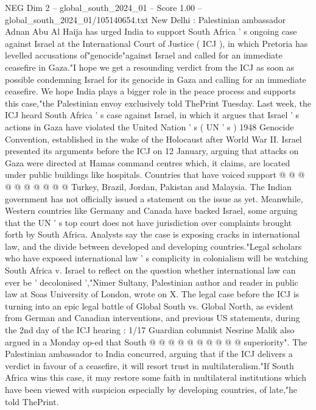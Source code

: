 \begin{textsample}{NEG Dim 2 – global\_south\_2024\_01 – Score 1.00 – global\_south\_2024\_01/105140654.txt}  \label{ex:f2_neg_328}
New Delhi : Palestinian ambassador Adnan Abu Al Haija has urged India to support South Africa ' s ongoing case against Israel at the International Court of Justice ( ICJ ), in which Pretoria has levelled accusations of"genocide"against Israel and called for an immediate ceasefire in Gaza."I hope we get a resounding verdict from the ICJ as soon as possible condemning Israel for its genocide in Gaza and calling for an immediate ceasefire.
We hope India plays a bigger role in the peace process and supports this case,"the Palestinian envoy exclusively told ThePrint Tuesday.
Last week, the ICJ heard South Africa ' s case against Israel, in which it argues that Israel ' s actions in Gaza have violated the United Nation ' s ( UN ' s ) 1948 Genocide Convention, established in the wake of the Holocaust after World War II.
Israel presented its arguments before the ICJ on 12 January, arguing that attacks on Gaza were directed at Hamas command centres which, it claims, are located under public buildings like hospitals.
Countries that have voiced support @ @ @ @ @ @ @ @ @ @ Turkey, Brazil, Jordan, Pakistan and Malaysia.
The Indian government has not officially issued a statement on the issue as yet.
Meanwhile, Western countries like Germany and Canada have backed Israel, some arguing that the UN ' s top court does not have jurisdiction over complaints brought forth by South Africa.
Analysts say the case is exposing cracks in international law, and the divide between developed and developing countries."Legal scholars who have exposed international law ' s complicity in colonialism will be watching South Africa v.
Israel to reflect on the question whether international law can ever be ' decolonised ',"Nimer Sultany, Palestinian author and reader in public law at Soas University of London, wrote on X.
The legal case before the ICJ is turning into an epic legal battle of Global South vs.
Global North, as evident from German and Canadian interventions, and previous US statements, during the 2nd day of the ICJ hearing : 1/17 Guardian columnist Nesrine Malik also argued in a Monday op-ed that South @ @ @ @ @ @ @ @ @ @ superiority".
The Palestinian ambassador to India concurred, arguing that if the ICJ delivers a verdict in favour of a ceasefire, it will resort trust in multilateralism."If South Africa wins this case, it may restore some faith in multilateral institutions which have been viewed with suspicion especially by developing countries, of late,"he told ThePrint.

\end{textsample}
